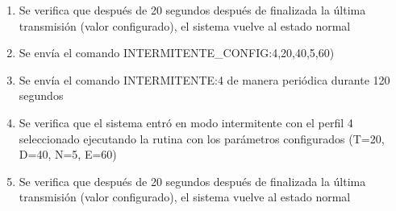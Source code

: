 \begin{enumerate}
\item	Se verifica que después de 20 segundos después de finalizada la última transmisión (valor configurado), el sistema vuelve al estado normal
\item	Se envía el comando INTERMITENTE\_CONFIG:4,20,40,5,60)
\item	Se envía el comando INTERMITENTE:4 de manera periódica durante 120 segundos
\item	Se verifica que el sistema entró en modo intermitente con el perfil 4 seleccionado ejecutando la rutina con los parámetros configurados (T=20, D=40, N=5, E=60)
\item	Se verifica que después de 20 segundos después de finalizada la última transmisión (valor configurado), el sistema vuelve al estado normal

\end{enumerate}

